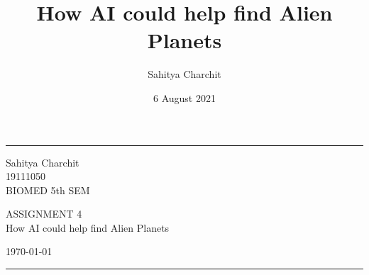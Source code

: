 \documentclass{article}
\title{How AI could help find Alien Planets}
\author{Sahitya Charchit }
\date{6 August 2021}
\begin{document}
    
    \fancyhead{}
    \hrule \medskip %
    \begin{minipage}{0.295\textwidth} 
    \raggedright
    \footnotesize
    Sahitya Charchit\hfill\\   
    19111050\hfill\\
    BIOMED 5th SEM
    \end{minipage}
    \begin{minipage}{0.4\textwidth} 
    \centering 
    \normalsize
    ASSIGNMENT 4\\
    \Large 
    How AI could help find Alien Planets\\ 
    \end{minipage}
    \begin{minipage}{0.295\textwidth} 
    \raggedleft
    \today\hfill\\
    \end{minipage}
    \medskip\hrule 
    \bigskip
\end{document}
